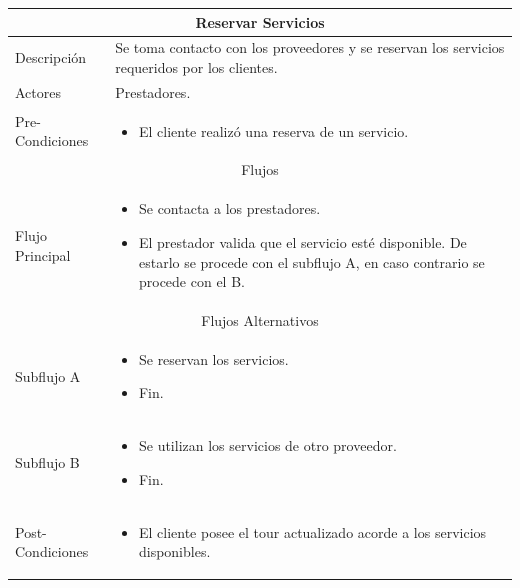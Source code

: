 \documentclass[12pt,a4paper]{article}
\newenvironment{myitemize}
{\begin{itemize}[leftmargin=*,noitemsep,topsep=0pt]}{\end{itemize}}
\newenvironment{caseuse}
{\begin{center}\begin{tabular}{|l|p{10cm}|}}{\end{tabular}\end{center}}
\begin{document}
			\begin{caseuse}
				\hline
				\multicolumn{2}{|c|}{Reservar Servicios} \\ \hline

				Descripción & Se toma contacto con los proveedores y se reservan los servicios requeridos por los clientes. \\ \hline

				Actores & Prestadores. \\ \hline

				Pre-Condiciones & 
					\begin{myitemize}
						\item El cliente realizó una reserva de un servicio.
					\end{myitemize} \\ \hline

				\multicolumn{2}{|c|}{Flujos} \\ \hline

				Flujo Principal &
					\begin{myitemize}
						\item Se contacta a los prestadores.
						\item El prestador valida que el servicio esté disponible. De estarlo se procede con el subflujo A, en caso contrario se procede con el B.
					\end{myitemize} \\ \hline

				\multicolumn{2}{|c|}{Flujos Alternativos} \\ \hline

				Subflujo A & 
					\begin{myitemize}
						\item Se reservan los servicios.
						\item Fin.
					\end{myitemize} \\ \hline

				Subflujo B & 
					\begin{myitemize}
						\item Se utilizan los servicios de otro proveedor.
						\item Fin.
					\end{myitemize} \\ \hline

				Post-Condiciones &
					\begin{myitemize}
						\item El cliente posee el tour actualizado acorde a los servicios disponibles.
					\end{myitemize}\\ \hline
			\end{caseuse}
\end{document}
